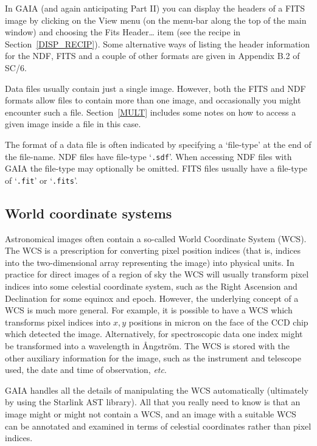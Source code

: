 \documentclass[twoside,11pt]{article}
\newcommand{\xref}[3]{#1}
\begin{document}
In GAIA (and again anticipating Part II) you can display the headers of a
FITS image by clicking on the {\sf View} menu (on the menu-bar along the
top of the main window) and choosing the {\sf Fits Header\ldots} item (see
the recipe in Section~\ref{DISP_RECIP}).  Some alternative ways of listing
the header information for the NDF, FITS and a couple of other formats are
given in \xref{Appendix B.2}{sc6}{EXAMFILE} of \xref{SC/6}{sc6}{}\cite{SC6}.

Data files usually contain just a single image.  However, both the FITS
and NDF formats allow files to contain more than one image, and occasionally
you might encounter such a file.  Section~\ref{MULT} includes some notes
on how to access a given image inside a file in this case.

The format of a data file is often indicated by specifying a `file-type'
at the end of the file-name.  NDF files have file-type `{\tt .sdf}'.
When accessing NDF files with GAIA the file-type may optionally be omitted.
FITS files usually have a file-type of `{\tt .fit}' or `{\tt .fits}'.

\subsection{\label{WCS}World coordinate systems}

Astronomical images often contain a so-called World Coordinate System
(WCS).  The WCS is a prescription for converting pixel position indices
(that is, indices into the two-dimensional array representing the image)
into physical units.  In practice for direct images of a region of sky
the WCS will usually transform pixel indices into some celestial coordinate
system, such as the Right Ascension and Declination for some equinox and
epoch.  However, the underlying concept of a WCS is much more general.
For example, it is possible to have a WCS which transforms pixel indices
into $x,y$\/ positions in micron on the face of the CCD chip which detected
the image.  Alternatively, for spectroscopic data one index might be
transformed into a wavelength in \AA ngstr\"{o}m.  The WCS is stored with
the other auxiliary information for the image, such as the instrument and
telescope used, the date and time of observation, \emph{etc}.

GAIA handles all the details of manipulating the WCS automatically
(ultimately by using the Starlink AST library).  All that you really
need to know is that an image might or might not contain a WCS, and an
image with a suitable WCS can be annotated and examined in terms of
celestial coordinates rather than pixel indices.
\end{document}

